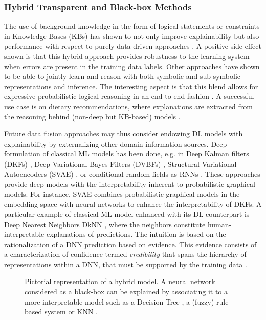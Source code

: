\documentclass[final]{elsarticle}
\begin{document}
\subsubsection{Hybrid Transparent and Black-box Methods} 

The use of background knowledge in the form of logical statements or constraints in Knowledge Bases (KBs) has shown to not only improve explainability but also performance with respect to purely data-driven approaches \cite{Donadello17,donadello2018semantic,dAvilaGarcez19NeSy}. A positive side effect shown is that this hybrid approach provides robustness to the learning system when errors are present in the training data labels. Other approaches have shown to be able to jointly learn and reason with both symbolic and sub-symbolic representations and inference. The interesting aspect is that this blend allows for expressive probabilistic-logical reasoning in an end-to-end fashion \cite{manhaeve2018deepproblog}. A successful use case is on dietary recommendations, where explanations are extracted from the reasoning behind (non-deep but KB-based) models \cite{Donadello19}.

Future data fusion approaches may thus consider endowing DL models with explainability by externalizing other domain information sources. Deep formulation of classical ML models has been done, e.g. in Deep Kalman filters (DKFs) \cite{Krishnan15}, Deep Variational Bayes Filters (DVBFs) \cite{Karl16}, Structural Variational Autoencoders (SVAE) \cite{Johnson16}, or conditional random fields as RNNs \cite{Zheng15}. These approaches provide deep models with the interpretability inherent to probabilistic graphical models. For instance, SVAE combines probabilistic graphical models in the embedding space with neural networks to enhance the interpretability of DKFs. A particular example of classical ML model enhanced with its DL counterpart is Deep Nearest Neighbors DkNN \cite{papernot2018deep}, where the neighbors constitute human-interpretable explanations of predictions. The intuition is based on the rationalization of a DNN prediction based on evidence. This evidence consists of a characterization of confidence termed \textit{credibility} that spans the hierarchy of representations within a DNN, that must be supported by the training data \cite{papernot2018deep}. 
\begin{figure}[ht]
        \caption{\label{fig:hybrid} Pictorial representation of a hybrid model. A neural network considered as a black-box can be explained by associating it to a more interpretable model such as a Decision Tree \cite{Narodytska18}, a (fuzzy) rule-based system \cite{Fernandez19} or KNN \cite{papernot2018deep}. 
        }
\end{figure}
\end{document}
